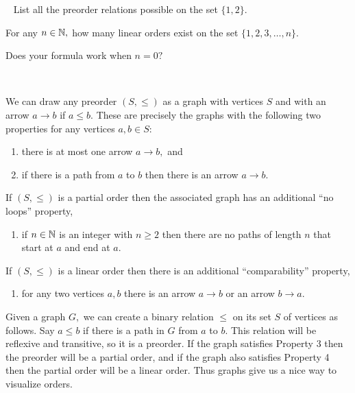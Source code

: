 \documentclass[CT4S-EN-RU]{subfiles}
\begin{document}
\begin{exerciseRUS}
\end{exerciseRUS}

\begin{exerciseENG}~
\sexc List all the preorder relations possible on the set $\{1,2\}.$
\item For any $n\in{\mathbb N},$ how many linear orders exist on the set $\{1,2,3,\ldots,n\}.$ 
\item Does your formula work when $n=0?$
\endsexc
\end{exerciseENG}

\begin{exerciseRUS}~
\end{exerciseRUS}

\begin{remarkENG}\label{rem:preorder to graph}
We can draw any preorder $(S,\leq)$ as a graph with vertices $S$ and with an arrow $a\to b$ if $a\leq b.$ These are precisely the graphs with the following two properties for any vertices $a,b\in S$:
\begin{enumerate}[\hsp 1.]
\item there is at most one arrow $a\to b,$ and
\item if there is a path from $a$ to $b$ then there is an arrow $a\to b.$
\end{enumerate}
If $(S,\leq)$ is a partial order then the associated graph has an additional “no loops” property,
\begin{enumerate}[\hsp 3.]
\item if $n\in{\mathbb N}$ is an integer with $n\geq 2$ then there are no paths of length $n$ that start at $a$ and end at $a.$
\end{enumerate}
If $(S,\leq)$ is a linear order then there is an additional “comparability” property,
\begin{enumerate}[\hsp 4.]
\item for any two vertices $a,b$ there is an arrow $a\to b$ or an arrow $b\to a.$
\end{enumerate}

Given a graph $G,$ we can create a binary relation $\leq$ on its set $S$ of vertices as follows. Say $a\leq b$ if there is a path in $G$ from $a$ to $b.$ This relation will be reflexive and transitive, so it is a preorder. If the graph satisfies Property 3 then the preorder will be a partial order, and if the graph also satisfies Property 4 then the partial order will be a linear order. Thus graphs give us a nice way to visualize orders.
\end{remarkENG}
\end{document}
